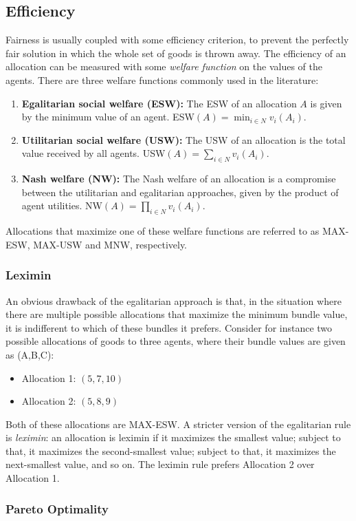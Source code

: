 \subsection{Efficiency}
Fairness is usually coupled with some efficiency criterion, to prevent the perfectly fair solution in which the whole set of goods is thrown away. The efficiency of an allocation can be measured with some \textit{welfare function} on the values of the agents. There are three welfare functions commonly used in the literature:
\begin{enumerate}
  \item \textbf{Egalitarian social welfare (ESW):} The ESW of an allocation $A$ is given by the minimum value of an agent. ESW$(A) = \min_{i\in N}v_i(A_i)$.
  \item \textbf{Utilitarian social welfare (USW):} The USW of an allocation is the total value received by all agents. USW$(A) = \sum_{i\in N}v_i(A_i)$.
  \item \textbf{Nash welfare (NW):} The Nash welfare of an allocation is a compromise between the utilitarian and egalitarian approaches, given by the product of agent utilities. NW$(A) = \prod_{i\in N}v_i(A_i)$.
\end{enumerate}
Allocations that maximize one of these welfare functions are referred to as MAX-ESW, MAX-USW and MNW, respectively. 

\subsubsection*{Leximin}
An obvious drawback of the egalitarian approach is that, in the situation where there are multiple possible allocations that maximize the minimum bundle value, it is indifferent to which of these bundles it prefers. Consider for instance two possible allocations of goods to three agents, where their bundle values are given as (A,B,C):
\begin{itemize}
  \item Allocation 1: $(5,7,10)$
  \item Allocation 2: $(5,8,9)$
\end{itemize}
Both of these allocations are MAX-ESW. A stricter version of the egalitarian rule is \textit{leximin}: an allocation is leximin if it maximizes the smallest value; subject to that, it maximizes the second-smallest value; subject to that, it maximizes the next-smallest value, and so on. The leximin rule prefers Allocation 2 over Allocation 1.

\subsubsection*{Pareto Optimality}
\skelpar


